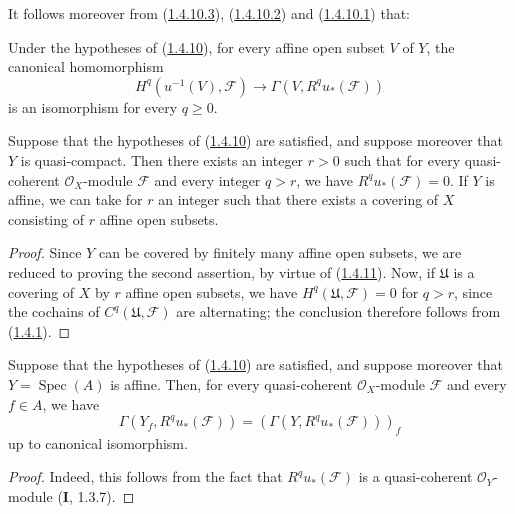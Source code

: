 It follows moreover from (\hyperref[III.1.4.10.3]{1.4.10.3}),
(\hyperref[III.1.4.10.2]{1.4.10.2}) and
(\hyperref[III.1.4.10.1]{1.4.10.1}) that:

\begin{corollary}[1.4.11]
\label{III.1.4.11}
Under the hypotheses of \textup{(\hyperref[III.1.4.10]{1.4.10})}, for every
affine open subset $V$ of $Y$, the canonical homomorphism
\begin{equation}
\label{III.1.4.11.1}
\tag{1.4.11.1}
H^q(u^{-1}(V),\mathcal F)\longrightarrow
\Gamma(V,R^qu_*(\mathcal F))
\end{equation}
is an isomorphism for every $q\geq0$.
\end{corollary}

\begin{corollary}[1.4.12]
\label{III.1.4.12}
Suppose that the hypotheses of
\textup{(\hyperref[III.1.4.10]{1.4.10})} are satisfied, and suppose moreover that
$Y$ is quasi-compact. Then there exists an integer $r>0$ such that for every
quasi-coherent $\mathcal O_X$-module $\mathcal F$ and every integer $q>r$,
we have $R^qu_*(\mathcal F)=0$. If $Y$ is affine, we can take for $r$ an
integer such that there exists a covering of $X$ consisting of $r$ affine
open subsets.
\end{corollary}

\begin{proof}
Since $Y$ can be covered by finitely many affine open subsets, we are
reduced to proving the second assertion, by virtue of
(\hyperref[III.1.4.11]{1.4.11}). Now, if $\mathfrak U$ is a
covering of $X$ by $r$ affine open subsets, we have
$H^q(\mathfrak U,\mathcal F)=0$ for $q>r$, since the cochains of
$C^q(\mathfrak U,\mathcal F)$ are alternating; the conclusion therefore
follows from (\hyperref[III.1.4.1]{1.4.1}).
\end{proof}

\begin{corollary}[1.4.13]
\label{III.1.4.13}
Suppose that the hypotheses of
\textup{(\hyperref[III.1.4.10]{1.4.10})} are satisfied, and suppose moreover that
$Y=\operatorname{Spec}(A)$ is affine. Then, for every quasi-coherent
$\mathcal O_X$-module $\mathcal F$ and every $f\in A$, we have
\[
\Gamma(Y_f,R^qu_*(\mathcal F))
=(\Gamma(Y,R^qu_*(\mathcal F)))_f
\]
up to canonical isomorphism.
\end{corollary}

\begin{proof}
Indeed, this follows from the fact that $R^qu_*(\mathcal F)$ is a
quasi-coherent $\mathcal O_Y$-module (\textbf{I}, 1.3.7).
\end{proof}

